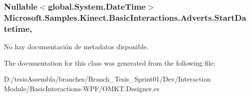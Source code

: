 \hypertarget{class_microsoft_1_1_samples_1_1_kinect_1_1_basic_interactions_1_1_adverts_a49a03fd75592345c7584bc761b46cf3e}{
\subsubsection[{Start\-Datetime}]{\setlength{\rightskip}{0pt plus 5cm}Nullable$<$global.\-System.\-Date\-Time$>$ Microsoft.\-Samples.\-Kinect.\-Basic\-Interactions.\-Adverts.\-Start\-Datetime\hspace{0.3cm}{\ttfamily [get]}, {\ttfamily [set]}}}\label{class_microsoft_1_1_samples_1_1_kinect_1_1_basic_interactions_1_1_adverts_a49a03fd75592345c7584bc761b46cf3e}


No hay documentación de metadatos disponible. 



The documentation for this class was generated from the following file\-:\begin{DoxyCompactItemize}
\item 
D\-:/tesis\-Assembla/branches/\-Branch\-\_\-\-Tesis\-\_\-\-Sprint01/\-Dev/\-Interaction Module/\-Basic\-Interactions-\/\-W\-P\-F/O\-M\-K\-T.\-Designer.\-cs\end{DoxyCompactItemize}
